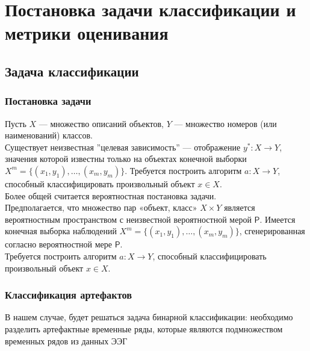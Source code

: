 \documentclass[12pt, a4paper, titlepage]{extreport}
\begin{document}
	\section*{Постановка задачи классификации и метрики оценивания}
	\subsection*{Задача классификации}
	\subsubsection*{Постановка задачи}
	Пусть $X$ — множество описаний объектов, 
	$Y$ — множество номеров (или наименований) классов. 
	\\Существует неизвестная ''целевая зависимость'' — отображение
	$y^{*}\colon X\to Y$,
	значения которой известны только на объектах конечной выборки
	$X^m = \{(x_1,y_1),\dots,(x_m,y_m)\}$.
	Требуется построить алгоритм 
	$a\colon X\to Y$,
	способный классифицировать произвольный объект
	$x \in X$.\\
	Более общей считается вероятностная постановка задачи.\\
	Предполагается, что множество пар «объект, класс» 
	$X \times Y$
	является вероятностным пространством
	с неизвестной вероятностной мерой $\mathsf P$. 
	Имеется конечная выборка наблюдений
	$X^m = \{(x_1,y_1),\dots,(x_m,y_m)\}$, 
	сгенерированная согласно вероятностной мере $\mathsf P$. \\
	Требуется построить алгоритм 
	$a\colon X\to Y$,
	способный классифицировать произвольный объект
	$x \in X$.
	\subsubsection*{Классификация артефактов}
	В нашем случае, будет решаться задача бинарной классификации: необходимо разделить артефактные временные ряды, которые являются подмножеством временных рядов из данных ЭЭГ
\end{document}
